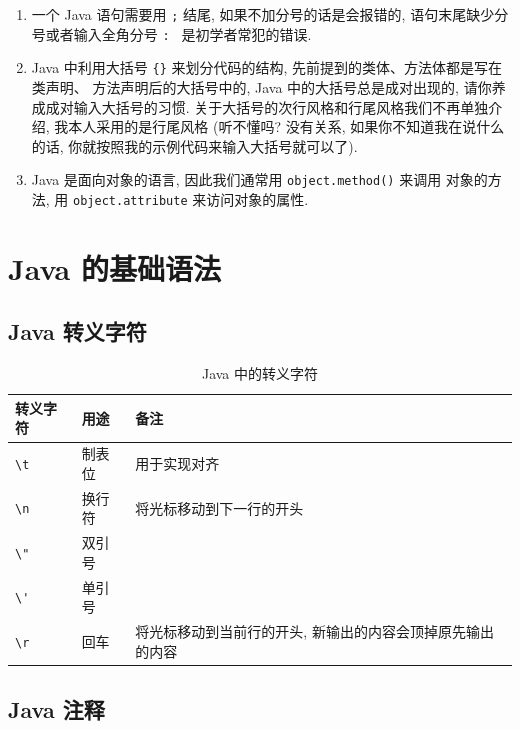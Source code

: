 \documentclass[10pt,UTF8]{book} %
\begin{document}
\begin{enumerate}
    \item 一个 Java 语句需要用 \lstinline|;| 结尾, 如果不加分号的话是会报错的,
    语句末尾缺少分号或者输入全角分号 \lstinline|: | 是初学者常犯的错误.
    
    \item Java 中利用大括号 \lstinline|{}| 来划分代码的结构, 先前提到的类体、方法体都是写在类声明、
    方法声明后的大括号中的, Java 中的大括号总是成对出现的, 请你养成成对输入大括号的习惯.
    关于大括号的次行风格和行尾风格我们不再单独介绍,
    我本人采用的是行尾风格 (听不懂吗?
    没有关系, 如果你不知道我在说什么的话, 你就按照我的示例代码来输入大括号就可以了).
    
    \item Java 是面向对象的语言, 因此我们通常用 \lstinline|object.method()| 来调用
    对象的方法, 用 \lstinline|object.attribute| 来访问对象的属性.
\end{enumerate}

\section{Java 的基础语法}

\subsection{Java 转义字符}

\begin{table}[H]
    \caption{Java 中的转义字符}
    \centering
    \begin{tabular}{l l p{6cm}}
        \hline
        转义字符 & 用途 & 备注 \\
        \hline
        \lstinline|\t| & 制表位 & 用于实现对齐 \\
        \lstinline|\n| & 换行符 & 将光标移动到下一行的开头 \\
        \lstinline|\"| & 双引号 \\
        \lstinline|\'| & 单引号 \\
        \lstinline|\r| & 回车   & 将光标移动到当前行的开头, 新输出的内容会顶掉原先输出的内容 \\
        \hline
    \end{tabular}
\end{table}

\subsection{Java 注释}
\end{document}
